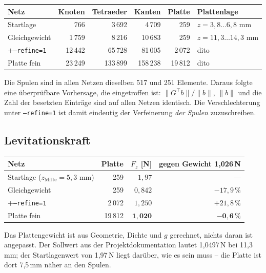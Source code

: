 \documentclass[11pt,a4paper]{article}
\begin{document}
\begin{center}
\begin{tabular}{lrrrrl}
\toprule
Netz & Knoten & Tetraeder & Kanten & Platte & Plattenlage \\
\midrule
Startlage        & 766    & 3\,692   & 4\,709   & 259     & $z = 3{,}8\ldots6{,}8$ mm \\
Gleichgewicht    & 1\,759 & 8\,216   & 10\,683  & 259     & $z = 11{,}3\ldots14{,}3$ mm \\
\quad$+$\texttt{--refine=1} & 12\,442 & 65\,728 & 81\,005 & 2\,072 & dito \\
Platte fein      & 23\,249 & 133\,899 & 158\,238 & 19\,812 & dito \\
\bottomrule
\end{tabular}
\end{center}

Die Spulen sind in allen Netzen dieselben 517 und 251 Elemente. Daraus folgte
eine überprüfbare Vorhersage, die eingetroffen ist: $\|G^{\!\top}b\|/\|b\|$,
$\|b\|$ und die Zahl der besetzten Einträge sind auf allen Netzen identisch.
Die Verschlechterung unter \texttt{--refine=1} ist damit eindeutig der
Verfeinerung \emph{der Spulen} zuzuschreiben.

\subsection{Levitationskraft}

\begin{center}
\begin{tabular}{lrrr}
\toprule
Netz & Platte & $F_z$ [N] & gegen Gewicht 1,026\,N \\
\midrule
Startlage ($z_{\text{Mitte}} = 5{,}3$ mm) & 259 & $1{,}97$ & --- \\
Gleichgewicht & 259 & $0{,}842$ & $-17{,}9\,\%$ \\
$+$\texttt{--refine=1} & 2\,072 & $1{,}250$ & $+21{,}8\,\%$ \\
Platte fein & 19\,812 & $\mathbf{1{,}020}$ & $\mathbf{-0{,}6\,\%}$ \\
\bottomrule
\end{tabular}
\end{center}

Das Plattengewicht ist aus Geometrie, Dichte und $g$ gerechnet, nichts daran
ist angepasst. Der Sollwert aus der Projektdokumentation lautet 1,0497\,N
bei 11,3\,mm; der Startlagenwert von 1,97\,N liegt darüber, wie es
sein muss -- die Platte ist dort 7,5\,mm näher an den Spulen.
\end{document}

